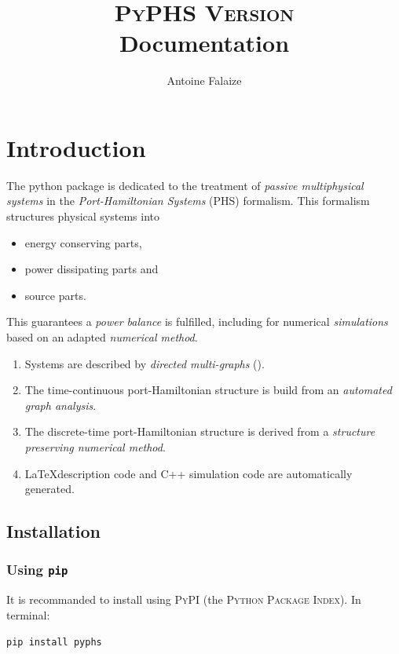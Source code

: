 \documentclass[10pt,a4paper]{article}
\author{Antoine Falaize}
\title{\textsc{PyPHS Version \version} \\ Documentation}
\begin{document}
%
\maketitle
%
\section{Introduction}
%
The python package  is dedicated to the treatment of \emph{passive multiphysical systems} in the \emph{Port-Hamiltonian Systems} (PHS) formalism. This formalism structures physical systems into 
%
\begin{itemize}
\item energy conserving parts, 
\item power dissipating parts and 
\item source parts.
\end{itemize}
%

This guarantees a \emph{power balance} is fulfilled, including for numerical \emph{simulations} based on an adapted \emph{numerical method}.   
%

\begin{enumerate}
\item Systems are described by \emph{directed multi-graphs} ().
\item The time-continuous port-Hamiltonian structure is build from an \emph{automated graph analysis}.
\item The discrete-time port-Hamiltonian structure is derived from a \emph{structure preserving numerical method}.
\item \LaTeX description code and \textsc{C++} simulation code are automatically generated.
\end{enumerate}
\subsection{Installation}
%
\subsubsection{{Using \texttt{pip}}}
%
It is recommanded to install  using \textsc{PyPI} (the \textsc{Python Package Index}). In terminal:
%
\begin{verbatim}
pip install pyphs
\end{verbatim}
%
\end{document}
